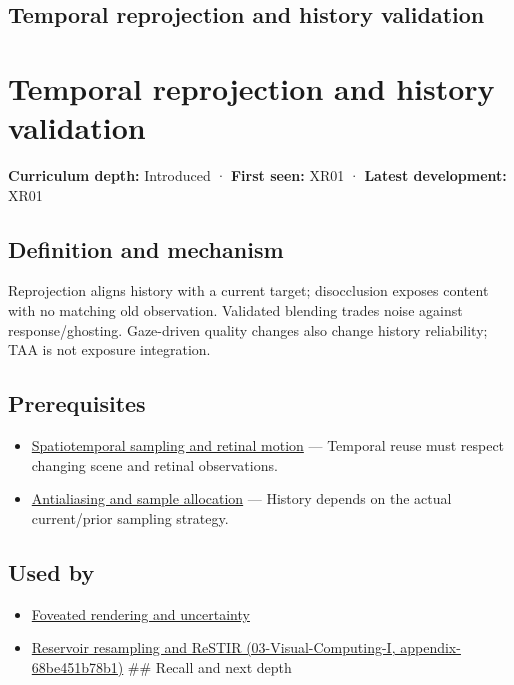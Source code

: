 \hypertarget{appendix-0727340a4428}{}
\section*{Temporal reprojection and history validation}
\chapter{Temporal reprojection and history validation}\label{appendix-0727340a4428-temporal-reprojection-and-history-validation}

\textbf{Curriculum depth:} Introduced · \textbf{First seen:} XR01 · \textbf{Latest development:} XR01

\section{Definition and mechanism}\label{appendix-0727340a4428-definition-and-mechanism}

Reprojection aligns history with a current target; disocclusion exposes content with no matching old observation. Validated blending trades noise against response/ghosting. Gaze-driven quality changes also change history reliability; TAA is not exposure integration.

\section{Prerequisites}\label{appendix-0727340a4428-prerequisites}

\begin{itemize}
\tightlist
\item
  \hyperref[appendix-70895739febb]{Spatiotemporal sampling and retinal motion} --- Temporal reuse must respect changing scene and retinal observations.
\item
  \hyperref[appendix-4192b2bdd21e]{Antialiasing and sample allocation} --- History depends on the actual current/prior sampling strategy.
\end{itemize}

\section{Used by}\label{appendix-0727340a4428-used-by}

\begin{itemize}
\item
  \hyperref[appendix-5878b813b732]{Foveated rendering and uncertainty}
\item
  \href{../03-Visual-Computing-I/main.pdf\#nameddest=appendix-68be451b78b1}{Reservoir resampling and ReSTIR (03-Visual-Computing-I, appendix-68be451b78b1)} \#\# Recall and next depth
\end{itemize}

